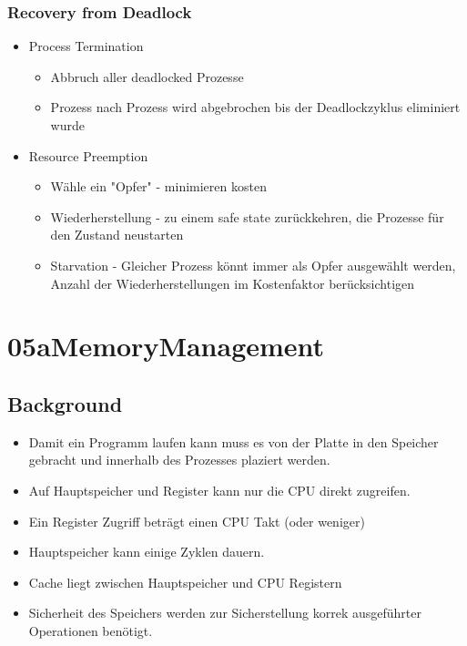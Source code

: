 \documentclass[a4paper]{scrreprt}
\begin{document}
	\subsection{Recovery from Deadlock}
				\begin{itemize}
					\item Process Termination
						\begin{itemize}
							\item Abbruch aller deadlocked Prozesse
							\item Prozess nach Prozess wird abgebrochen bis der Deadlockzyklus eliminiert wurde
						\end{itemize}
					\item Resource Preemption
						\begin{itemize}
							\item Wähle ein "Opfer" - minimieren kosten
							\item Wiederherstellung - zu einem safe state zurückkehren, die Prozesse für den Zustand neustarten
							\item Starvation - Gleicher Prozess könnt immer als Opfer ausgewählt werden, Anzahl der Wiederherstellungen im Kostenfaktor berücksichtigen
						\end{itemize}
				\end{itemize}
\chapter{05aMemoryManagement}
\section{Background}
\begin{itemize}
\item Damit ein Programm laufen kann muss es von der Platte in den Speicher gebracht und innerhalb des Prozesses plaziert werden.

\item Auf Hauptspeicher und Register kann nur die CPU direkt zugreifen.

\item Ein Register Zugriff beträgt einen CPU Takt (oder weniger)

\item Hauptspeicher kann einige Zyklen dauern.

\item Cache liegt zwischen Hauptspeicher und CPU Registern

\item Sicherheit des Speichers werden zur Sicherstellung korrek ausgeführter Operationen benötigt.

\end{itemize}
\end{document}
